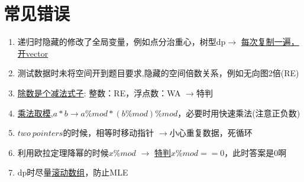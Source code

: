 


\section{常见错误}
\begin{enumerate}
\item 递归时隐藏的修改了全局变量，例如点分治重心，树型dp$\rightarrow$ \underline{每次复制一遍，开vector}
\item 测试数据时未将空间开到题目要求,隐藏的空间倍数关系，例如无向图2倍(RE)
\item \underline{除数是个减法式子}: 整数：RE，浮点数：WA $\rightarrow$特判
\item \underline{乘法取模},$a*b \rightarrow a\% mod*(b\% mod)\% mod$，必要时用快速乘法(注意正负数)
\item $two\  pointers$的时候，相等时移动指针 $\rightarrow$小心重复数据，死循环
\item 利用欧拉定理降幂的时候$x\% mod$ $\rightarrow$ \underline{特判$x\% mod==0$}，此时答案是0啊
\item dp时尽量\underline{滚动数组}，防止MLE
\end{enumerate}


